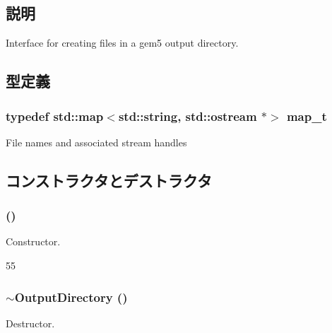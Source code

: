 \subsection{説明}
Interface for creating files in a gem5 output directory. 

\subsection{型定義}
\hypertarget{classOutputDirectory_a45c5e1cccd11ddd0103631655703d5e2}{
\subsubsection[{map\_\-t}]{\setlength{\rightskip}{0pt plus 5cm}typedef std::map$<$std::string, std::ostream $\ast$$>$ {\bf map\_\-t}}}
\label{classOutputDirectory_a45c5e1cccd11ddd0103631655703d5e2}
File names and associated stream handles 

\subsection{コンストラクタとデストラクタ}
\hypertarget{classOutputDirectory_a0ccc7a2d2bdd34073949e2fbccb58a3b}{
\subsubsection[{OutputDirectory}]{ ()}}
\label{classOutputDirectory_a0ccc7a2d2bdd34073949e2fbccb58a3b}
Constructor. 


\begin{DoxyCode}
55 {}
\end{DoxyCode}
\hypertarget{classOutputDirectory_a9257cd7515c7b1a88a4de758c2f00d46}{
\subsubsection[{$\sim$OutputDirectory}]{\setlength{\rightskip}{0pt plus 5cm}$\sim${\bf OutputDirectory} ()}}
\label{classOutputDirectory_a9257cd7515c7b1a88a4de758c2f00d46}
Destructor. 


